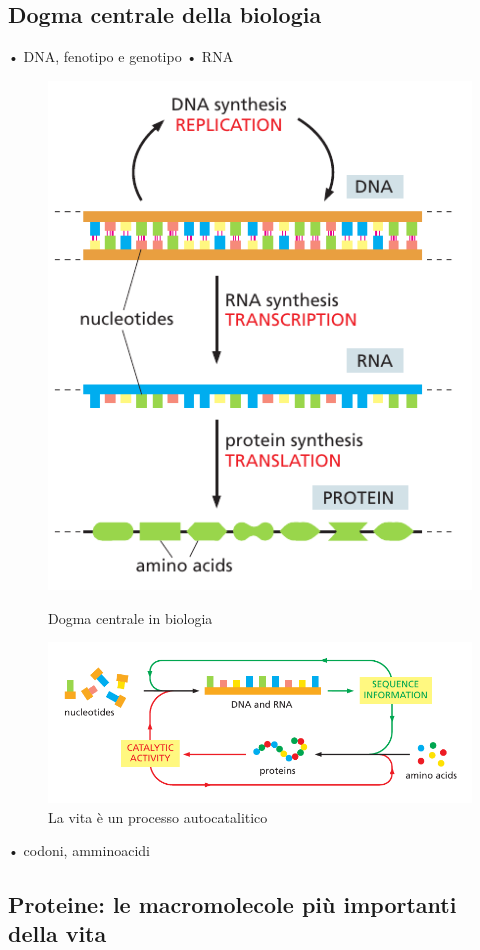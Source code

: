 \subsection{Dogma centrale della biologia}
• DNA, fenotipo e genotipo
• RNA

\begin{figure}[!htb]
	\includegraphics[scale=0.45]{images/central-dogma.png}
	\caption{Dogma centrale in biologia}\label{fig:awesome_image1}
	\endminipage\hfill
	\includegraphics[width=\linewidth]{images/vita-autocatalitica.png}
	\caption{La vita è un processo autocatalitico}\label{fig:awesome_image2}
	\endminipage\hfill
\end{figure}


• codoni, amminoacidi
\subsection{Proteine: le macromolecole più importanti della vita}

